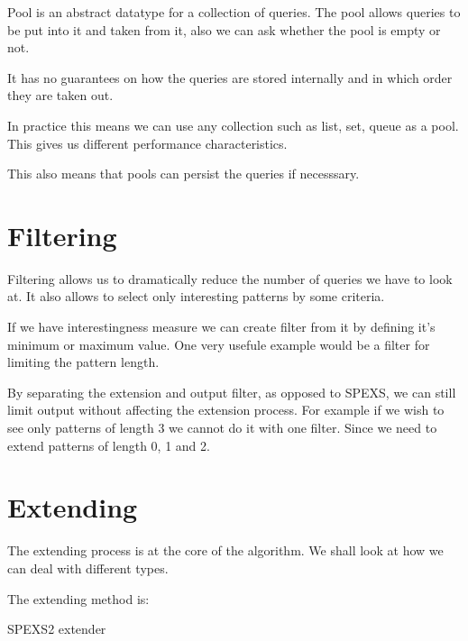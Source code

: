 Pool is an abstract datatype for a collection of queries. The pool
allows queries to be put into it and taken from it, also we can
ask whether the pool is empty or not.

It has no guarantees on how the queries are stored internally and
in which order they are taken out.

In practice this means we can use any collection such as list, set,
queue as a pool. This gives us different performance characteristics.

This also means that pools can persist the queries if necesssary.

\section{Filtering}

Filtering allows us to dramatically reduce the number of queries
we have to look at. It also allows to select only interesting patterns by
some criteria.

If we have interestingness measure we can create filter from it by
defining it's minimum or maximum value. One very usefule example 
would be a filter for limiting the pattern length.

By separating the extension and output filter, as opposed to SPEXS, 
we can still limit output without affecting the extension process.
For example if we wish to see only patterns of length 3 we cannot do
it with one filter. Since we need to extend patterns of length 0, 1 and 2.

\section{Extending}

The extending process is at the core of the algorithm. 
We shall look at how we can deal with different types.

The extending method is:

\begin{algorithm}[H]
	\caption{SPEXS2 extender}
\begin{algorithmic}[1]
	
	\EndFor

		\EndIf
	\EndFor

	\EndFor
\end{algorithmic}
\end{algorithm}

